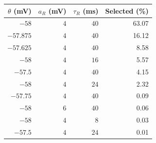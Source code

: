 \begin{tabular}{rrrr}
\toprule
$\theta$ (mV) & $a_R$ (mV) & $\tau_R$ (ms) & Selected (\%)\\
\midrule
$-58$ & $4$ & $40$ & 63.07\\
$-57.875$ & $4$ & $40$ & 16.12\\
$-57.625$ & $4$ & $40$ & 8.58\\
$-58$ & $4$ & $16$ & 5.57\\
$-57.5$ & $4$ & $40$ & 4.15\\
$-58$ & $4$ & $24$ & 2.32\\
$-57.75$ & $4$ & $40$ & 0.09\\
$-58$ & $6$ & $40$ & 0.06\\
$-58$ & $4$ & $8$ & 0.03\\
$-57.5$ & $4$ & $24$ & 0.01\\
\bottomrule
\end{tabular}
